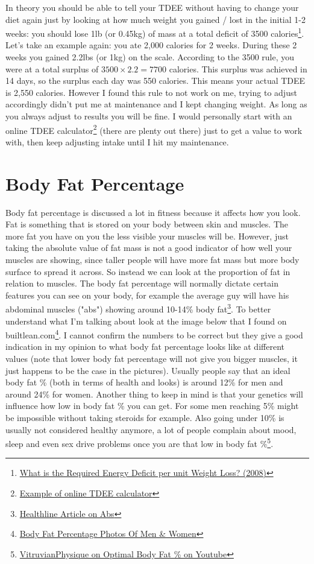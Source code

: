 \documentclass[openany, 12pt]{book}
\begin{document}
	In theory you should be able to tell your TDEE without having
	to change your diet again just by looking at how much weight you gained / lost in the initial 1-2 weeks: you should lose 1lb (or 0.45kg) of mass at 
	a total deficit of 3500 calories\footnote{\href{https://www.ncbi.nlm.nih.gov/pmc/articles/PMC2376744/}{What is the Required Energy Deficit per 
	unit Weight Loss? (2008)}}. Let's take an example again: you ate 2,000 calories for 2 weeks. During these 2 weeks you gained 2.2lbs (or 1kg) on the
	scale. According to the 3500 rule, you were at a total surplus of $3500 \times 2.2 = 7700$ calories. This surplus was achieved in 14 days, so the
	surplus each day was 550 calories. This means your actual TDEE is 2,550 calories. However I found this rule to not work on me, trying to adjust 
	accordingly didn't put me at maintenance and I kept changing weight. As long as you always adjust to results you will be fine. I would personally
	start with an online TDEE calculator\footnote{\href{https://tdeecalculator.net/}{Example of online TDEE calculator}} (there are plenty out there) 
	just to get a value to work with, then keep adjusting intake until I hit my maintenance.
	
	
	\section{Body Fat Percentage}
	
	Body fat percentage is discussed a lot in fitness because it affects how you look. Fat is something that is stored on your body between skin and muscles. The more fat you have on you the less visible your muscles will be. However, just taking the absolute value of fat mass is not a good indicator of how well your muscles are showing, since taller people will have more fat mass but more body surface to spread it across. So instead we can look at the proportion of fat in relation to muscles. The body fat percentage will normally dictate certain features you can see on your body, for example the average guy will have his abdominal muscles ("abs") showing around 10-14\% body fat\footnote{\href{https://www.healthline.com/health/body-fat-percentage-for-abs}{Healthline Article on Abs}}. To better understand what I'm talking about look at the image below that I found on builtlean.com\footnote{\href{https://www.builtlean.com/body-fat-percentage-men-women/}{Body Fat Percentage Photos Of Men \& Women}}. I cannot confirm the numbers to be correct but they give a good indication in my opinion to what body fat percentage looks like at different values (note that lower body fat percentage will not give you bigger muscles, it just happens to be the case in the pictures). Usually people say that an ideal body fat \% (both in terms of health and looks) is around 12\% for men and around 24\% for women. Another thing to keep in 
	mind is that your genetics will influence how low in body fat \% you can get. For some men reaching 5\% might be impossible without taking steroids for example. Also going
	under 10\% is usually not considered healthy anymore, a lot of people complain about mood, sleep and even sex drive problems once you are that low in body fat \%\footnote{\href{https://www.youtube.com/watch?v=IHvmtvzOfDg}{VitruvianPhysique on Optimal Body Fat \% on Youtube}}. 
	
\end{document}
